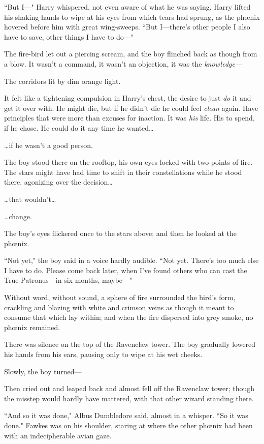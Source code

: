 ``But I—" Harry whispered, not even aware of what he was saying. Harry lifted his shaking hands to wipe at his eyes from which tears had sprung, as the phœnix hovered before him with great wing-sweeps. ``But I—there's other people I also have to save, other things I have to do—"

The fire-bird let out a piercing scream, and the boy flinched back as though from a blow. It wasn't a command, it wasn't an objection, it was the \emph{knowledge—}

The corridors lit by dim orange light.

It felt like a tightening compulsion in Harry's chest, the desire to just \emph{do} it and get it over with. He might die, but if he didn't die he could feel \emph{clean} again. Have principles that were more than excuses for inaction. It was \emph{his} life. His to spend, if he chose. He could do it any time he wanted{\ldots}

{\ldots}if he wasn't a good person.

\later

The boy stood there on the rooftop, his own eyes locked with two points of fire. The stars might have had time to shift in their constellations while he stood there, agonizing over the decision{\ldots}

{\ldots}that wouldn't{\ldots}

{\ldots}change.

The boy's eyes flickered once to the stars above; and then he looked at the phœnix.

``Not yet," the boy said in a voice hardly audible. ``Not yet. There's too much else I have to do. Please come back later, when I've found others who can cast the True Patronus—in six months, maybe—"

Without word, without sound, a sphere of fire surrounded the bird's form, crackling and blazing with white and crimson veins as though it meant to consume that which lay within; and when the fire dispersed into grey smoke, no phœnix remained.

There was silence on the top of the Ravenclaw tower. The boy gradually lowered his hands from his ears, pausing only to wipe at his wet cheeks.

Slowly, the boy turned—

Then cried out and leaped back and almost fell off the Ravenclaw tower; though the misstep would hardly have mattered, with that other wizard standing there.

``And so it was done," Albus Dumbledore said, almost in a whisper. ``So it was done." Fawkes was on his shoulder, staring at where the other phœnix had been with an indecipherable avian gaze.

